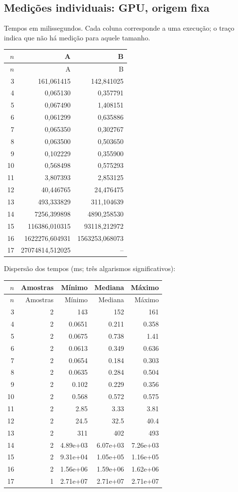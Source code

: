 \subsection{Medições individuais: GPU, origem fixa}
Tempos em milissegundos. Cada coluna corresponde a uma execução; o traço indica que não há medição para aquele tamanho.
\begingroup\small\setlength{\tabcolsep}{4pt}
\begin{longtable}{rrr}
\toprule
$n$ & A & B \\
\midrule\endfirsthead
\toprule $n$ & A & B \\
\midrule\endhead
3 & 161,061415 & 142,841025 \\
4 & 0,065130 & 0,357791 \\
5 & 0,067490 & 1,408151 \\
6 & 0,061299 & 0,635886 \\
7 & 0,065350 & 0,302767 \\
8 & 0,063500 & 0,503650 \\
9 & 0,102229 & 0,355900 \\
10 & 0,568498 & 0,575293 \\
11 & 3,807393 & 2,853125 \\
12 & 40,446765 & 24,476475 \\
13 & 493,333829 & 311,104639 \\
14 & 7256,399898 & 4890,258530 \\
15 & 116386,010315 & 93118,212972 \\
16 & 1622276,604931 & 1563253,068073 \\
17 & 27074814,512025 & -- \\
\bottomrule
\end{longtable}
\endgroup
\noindent Dispersão dos tempos (ms; três algarismos significativos):
\begin{longtable}{rrrrr}
\toprule
$n$ & Amostras & Mínimo & Mediana & Máximo \\
\midrule\endfirsthead
\toprule
$n$ & Amostras & Mínimo & Mediana & Máximo \\
\midrule\endhead
3 & 2 & 143 & 152 & 161 \\
4 & 2 & 0.0651 & 0.211 & 0.358 \\
5 & 2 & 0.0675 & 0.738 & 1.41 \\
6 & 2 & 0.0613 & 0.349 & 0.636 \\
7 & 2 & 0.0654 & 0.184 & 0.303 \\
8 & 2 & 0.0635 & 0.284 & 0.504 \\
9 & 2 & 0.102 & 0.229 & 0.356 \\
10 & 2 & 0.568 & 0.572 & 0.575 \\
11 & 2 & 2.85 & 3.33 & 3.81 \\
12 & 2 & 24.5 & 32.5 & 40.4 \\
13 & 2 & 311 & 402 & 493 \\
14 & 2 & 4.89e+03 & 6.07e+03 & 7.26e+03 \\
15 & 2 & 9.31e+04 & 1.05e+05 & 1.16e+05 \\
16 & 2 & 1.56e+06 & 1.59e+06 & 1.62e+06 \\
17 & 1 & 2.71e+07 & 2.71e+07 & 2.71e+07 \\
\bottomrule
\end{longtable}
